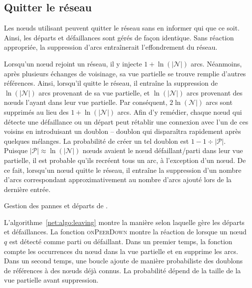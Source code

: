 \subsection{Quitter le réseau}
\label{net:subsec:leaving}

Les nœuds utilisant \SPRAY peuvent quitter le réseau sans en informer qui que ce
soit. Ainsi, les départs et défaillances sont gérés de façon identique. Sans
réaction appropriée, la suppression d'arcs entraînerait l'effondrement du
réseau.

Lorsqu'un nœud rejoint un réseau, il y injecte $1+\ln(|\mathcal{N}|)$
arcs. Néanmoins, après plusieurs échanges de voisinage, sa vue partielle se
trouve remplie d'autres références. Ainsi, lorsqu'il quitte le réseau, il
entraîne la suppression de $\ln(|\mathcal{N}|)$ arcs provenant de sa vue
partielle, et $\ln(|\mathcal{N}|)$ arcs provenant des nœuds l'ayant dans leur
vue partielle. Par conséquent, $2\ln(\mathcal{N}|)$ arcs sont supprimés au lieu
des $1+\ln(|\mathcal{N}|)$ arcs. Afin d'y remédier, chaque nœud qui détecte une
défaillance ou un départ peut rétablir une connexion avec l'un de ces voisins en
introduisant un doublon -- doublon qui disparaîtra rapidement après quelques
mélanges. La probabilité de créer un tel doublon est
$1-1\div{|\mathcal{P}|}$. Puisque ${|\mathcal{P}|}\approx \ln(|\mathcal{N}|)$
nœuds avaient le nœud défaillant/parti dans leur vue partielle, il est probable
qu'ils recréent tous un arc, à l'exception d'un nœud. De ce fait, lorsqu'un nœud
quitte le réseau, il entraîne la suppression d'un nombre d'arcs correspondant
approximativement au nombre d'arcs ajouté lors de la dernière entrée.

\begin{algorithm}[h]
  
  \caption[Gestion des pannes et départs de \SPRAY]
  {\label{net:algo:leaving}Gestion des pannes et départs de \SPRAY.}
\end{algorithm}

L'algorithme~\ref{net:algo:leaving} montre la manière selon laquelle \SPRAY gère
les départs et défaillances. La fonction \textsc{onPeerDown} montre la réaction
de \SPRAY lorsque un nœud $q$ est détecté comme parti ou défaillant. Dans un
premier temps, la fonction compte les occurrences du nœud dans la vue partielle
et en supprime les arcs. Dans un second temps, une boucle ajoute de manière
probabiliste des doublons de références à des nœuds déjà connus. La probabilité
dépend de la taille de la vue partielle avant suppression.

